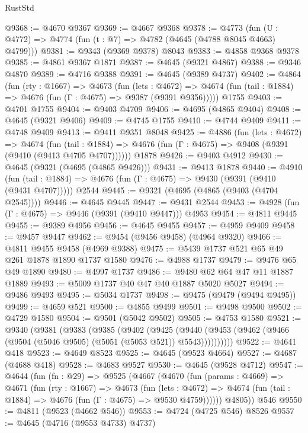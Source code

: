 \begin{lexlean}{RustStd}
\begin{coremodule}
@9368 := @4670 @9367
@9369 := @4667 @9368
@9378 := @4773 (fun (U : @4772) => @4774 (fun (t : @7) => @4782 (@4645 (@4788 @8045 @4663) @4799)))
@9381 := @9343 (@9369 @9378) @8043
@9383 := @4858 @9368 @9378
@9385 := @4861 @9367 @1871
@9387 := @4645 (@9321 @4867)
@9388 := @9346 @4870
@9389 := @4716 @9388
@9391 := @4645 (@9389 @4737)
@9402 := @4864
    (fun (rty : @1667) =>
    @4673
      (fun (lets : @4672) =>
      @4674 (fun (tail : @1884) => @4676 (fun (Γ : @4675) => @9387 (@9391 @9356)))))
    @1755
@9403 := @4701 @1755
@9404 := @9403 @4709
@9406 := @4695 (@4865 @9404)
@9408 := @4645 (@9321 @9406)
@9409 := @4745 @1755
@9410 := @4744 @9409
@9411 := @4748 @9409
@9413 := @9411 @9351 @8048
@9425 := @4886
    (fun (lets : @4672) =>
    @4674
      (fun (tail : @1884) => @4676 (fun (Γ : @4675) => @9408 (@9391 (@9410 (@9413 @4705 @4707))))))
    @1878
@9426 := @9403 @4912
@9430 := @4645 (@9321 (@4695 (@4865 @9426)))
@9431 := @9413 @1878
@9440 := @4910
    (fun (tail : @1884) => @4676 (fun (Γ : @4675) => @9430 (@9391 (@9410 (@9431 @4707)))))
    @2544
@9445 := @9321 (@4695 (@4865 (@9403 (@4704 @2545))))
@9446 := @4645 @9445
@9447 := @9431 @2544
@9453 := @4928 (fun (Γ : @4675) => @9446 (@9391 (@9410 @9447))) @4953
@9454 := @4811 @9445
@9455 := @9389 @4956
@9456 := @4645 @9455
@9457 := @4959 @9409
@9458 := @9457 @9447
@9462 := @9454 (@9456 @9458) (@4964 @9320)
@9466 := @4811 @9455 @9458 (@4969 @9388)
@9475 := @5439 @1737 @521 @65 @49 @261 @1878 @1890 @1737 @1580
@9476 := @4988 @1737
@9479 := @9476 @65 @49 @1890
@9480 := @4997 @1737
@9486 := @9480 @62 @64 @47 @11 @1887 @1889
@9493 := @5009 @1737 @40 @47 @40 @1887 @5020 @5027
@9494 := @9486 @9493
@9495 := @5034 @1737
@9498 := @9475 (@9479 (@9494 @9495))
@9499 := @4659 @521
@9500 := @4855 @9499
@9501 := @9498 @9500
@9502 := @4729 @1580
@9504 := @9501 (@5042 @9502)
@9505 := @4753 @1580
@9521 := @9340
    (@9381
      (@9383
        (@9385
          (@9402
            (@9425
              (@9440 (@9453 (@9462 (@9466 (@9504 (@5046 @9505) (@5051 (@5053 @521)) @5543))))))))))
@9522 := @4641 @418
@9523 := @4649 @8523
@9525 := @4645 (@9523 @4664)
@9527 := @4687 (@4688 @418)
@9528 := @4683 @9527
@9530 := @4645 (@9528 @4712)
@9547 := @4644
    (fun (fn : @29) =>
    @9525
      (@4667
        (@4670
          (fun (params : @4669) =>
          @4671
            (fun (rty : @1667) =>
            @4673
              (fun (lets : @4672) =>
              @4674 (fun (tail : @1884) => @4676 (fun (Γ : @4675) => @9530 @4759))))))
        @4805))
    @546
@9550 := @4811 (@9523 (@4662 @546))
@9553 := @4724 (@4725 @546) @8526
@9557 := @4645 (@4716 (@9553 @4733) @4737)

\end{coremodule}
\end{lexlean}
